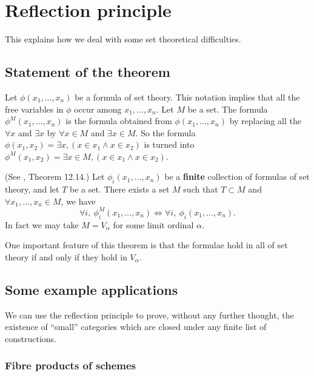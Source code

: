 \section{Reflection principle}
\label{section-reflection-principle}

\noindent
This explains how we deal with some
set theoretical difficulties. 

\subsection{Statement of the theorem}
\label{subsection-reflection-theorem}

\noindent
Let $\phi(x_1,\ldots,x_n)$ be a formula of set theory.
This notation implies that all the free variables in $\phi$
occur among $x_1,\ldots,x_n$. Let $M$ be a set.
The formula $\phi^M(x_1,\ldots,x_n)$ is the formula obtained 
from $\phi(x_1,\ldots,x_n)$ by replacing all the
$\forall x$ and $\exists x$ by $\forall x\in M$ and $\exists x\in M$.
So the formula
$\phi(x_1,x_2) = \exists x, (x\in x_1 \wedge x\in x_2)$
is turned  into
$\phi^M(x_1,x_2) = \exists x \in M, (x\in x_1 \wedge x\in x_2)$.

\begin{theorem}
\label{theorem-reflection-principle}
(See \cite{Jech}, Theorem 12.14.)
Let $\phi_i(x_1,\ldots,x_n)$ be a {\bf finite} collection of
formulas of set theory, and let $T$ be a set.
There exists a set $M$ such that
$T \subset M$ and
$\forall x_1,\ldots,x_n \in M$, we have
$$
\forall i,\  
\phi_i^{M}(x_1,\ldots,x_n)
\Leftrightarrow
\forall i,\  
\phi_i(x_1,\ldots,x_n).
$$
In fact we may take $M = V_\alpha$ for some limit ordinal $\alpha$.
\end{theorem}

\noindent
One important feature of this theorem is that the
formulae hold in all of set theory if and only if they
hold in $V_\alpha$.

\subsection{Some example applications}
\label{example-reflection-principle}

\noindent
We can use the reflection principle to
prove, without any further thought, the 
existence of ``small'' categories which are
closed under any finite list of constructions.

\subsubsection{Fibre products of schemes}

